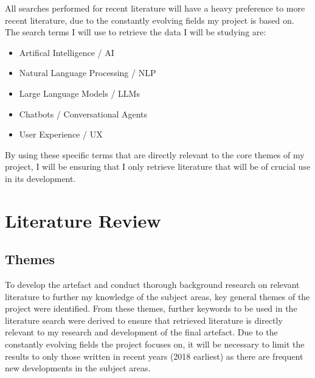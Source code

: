 \documentclass[12pt]{report}
\begin{document}
    \noindent 
    All searches performed for recent literature will have a heavy preference 
    to more recent literature, due to the constantly evolving fields my project is based on. 
    The search terms I will use to retrieve the data I will be studying are:

    \begin{itemize}
        \item Artifical Intelligence / AI 
        \item Natural Language Processing / NLP
        \item Large Language Models / LLMs
        \item Chatbots / Conversational Agents
        \item User Experience / UX
    \end{itemize}

    \noindent
    By using these specific terms that are directly relevant to the core themes of my project,
    I will be ensuring that I only retrieve literature that will be of crucial use in its 
    development.


    \chapter{Literature Review}

    \section{Themes}

    To develop the artefact and conduct thorough background research on relevant literature to further my 
    knowledge of the subject areas, key general themes of the project were identified. From these themes, further 
    keywords to be used in the literature search were derived to ensure that retrieved literature is directly relevant 
    to my research and development of the final artefact. Due to the constantly evolving fields the project focuses 
    on, it will be necessary to limit the results to only those written in recent years (2018 earliest) as there are 
    frequent new developments in the subject areas.
\end{document}
